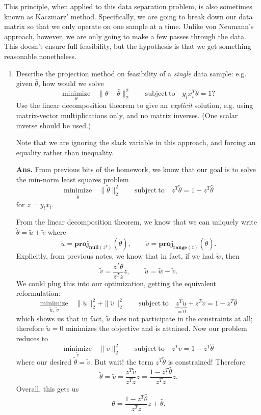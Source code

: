 \documentclass{article}
\newcommand{\minimize}[1]{\underset{#1}{\text{minimize}}}
\newcommand{\proj}{\mathbf{proj}}
\newcommand{\range}{\mathbf{range}}
\newcommand{\vnull}{\mathbf{null}}
\newcommand{\subjto}{\mathrm{subject~to}}
\newcommand{\showsolution}[1]{\textbf{Ans.} \;#1}
\begin{document}
\begin{enumerate}
This principle, when applied to this data separation problem,  is also sometimes known as Kaczmarz' method. Specifically, we are going to break down our data matrix so that we only operate on one sample at a time. Unlike von Neumann's approach, however, we are only going to make a few passes through the data. This doesn't ensure full feasibility, but the hypothesis is that we get something reasonable nonetheless.

\begin{enumerate}
\item Describe the projection method on feasibility of a \emph{single} data sample: e.g. given $\hat \theta$,  how would we solve
\[
\minimize{\theta} \quad \|\theta - \hat \theta\|_2^2 \qquad \subjto \quad y_ix_i^T\theta  = 1?
\]
Use the linear decomposition theorem to give an \emph{explicit} solution, e.g. using matrix-vector multiplications only, and no matrix inverses. (One scalar inverse should be used.)

Note that we are ignoring the slack variable in this approach, and forcing an equality rather than inequality.

\showsolution{
From previous bits of the homework, we know that our goal is to solve the min-norm least squares problem 
\[
\minimize{\tilde \theta} \quad \|\tilde \theta\|_2^2  \qquad \subjto \quad z^T\tilde \theta = 1-z^T\hat \theta
\]
for $z =  y_ix_i $.

From the linear decomposition theorem, we know that we can uniquely write $\tilde \theta = \tilde u + \tilde v$ where 
\[
\tilde u = \proj_{\vnull(z^T)}(\tilde \theta), \qquad \tilde v = \proj_{\range(z)}(\tilde \theta).
\]
Explicitly, from previous notes, we know that in fact, if we had $\tilde w$, then
\[
\tilde v = \frac{z^T\tilde \theta}{z^Tz} z, \qquad \tilde u = \tilde w - \tilde v.
\]
We could plug this into our optimization, getting the equivalent reformulation:
\[
\minimize{\tilde u, \; \tilde v} \quad \|\tilde u\|_2^2 + \|\tilde v\|_2^2 \qquad \subjto \quad \underbrace{z^T\tilde u}_{=0} + z^T\tilde v = 1-z^T\hat \theta
\]
which shows us that in fact, $\tilde u$ does not participate in the constraints at all; therefore $\tilde u = 0$ minimizes the objective and is attained. Now our problem reduces to 
\[
\minimize{\tilde v} \quad  \|\tilde v\|_2^2 \qquad \subjto \quad z^T\tilde v = 1-z^T\hat \theta
\]
where our desired $\tilde \theta = \tilde v$. But wait!  the term $z^T\tilde \theta$ is constrained! Therefore 
\[
\tilde \theta = \tilde v = \frac{z^T\tilde v}{z^Tz} z = \frac{1-z^T\hat \theta}{z^Tz} z.
\]
Overall, this gets us 
\[
\theta = \frac{1-z^T\hat \theta}{z^Tz} z + \hat \theta.
\]
}


\end{enumerate}
\end{enumerate}
\end{document}
